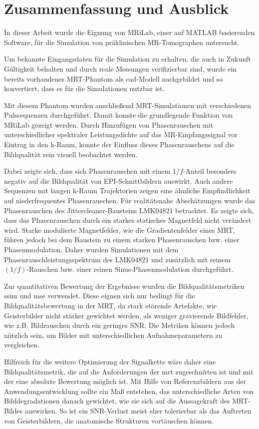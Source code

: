 \chapter{Zusammenfassung und Ausblick}
In dieser Arbeit wurde die Eignung von MRiLab, einer auf MATLAB basierenden Software, für die Simulation von präklinischen MR-Tomographen untersucht.

Um bekannte Eingangsdaten für die Simulation zu erhalten, die auch in Zukunft Gültigkeit behalten und durch reale Messungen verifizierbar sind, wurde ein bereits vorhandenes MRT-Phantom als \gls{cad}-Modell nachgebildet und so konvertiert, dass es für die Simulationen nutzbar ist.

Mit diesem Phantom wurden anschließend MRT-Simulationen mit verschiedenen Pulssequenzen durchgeführt. Damit konnte die grundlegende Funktion von MRiLab gezeigt werden. Durch Hinzufügen von Phasen\-rauschen mit unterschiedlicher spektraler Leistungsdichte auf das MR-\-Empfangs\-signal vor Eintrag in den k-Raum, konnte der Einfluss dieses Phasenrauschens auf die Bildqualität rein visuell beobachtet werden.

Dabei zeigte sich, dass sich Phasenrauschen mit einem $1/f$-Anteil besonders negativ auf die Bildqualität von EPI-Schnittbildern auswirkt. Auch andere Sequenzen mit langen k-Raum Trajektorien zeigen eine ähnliche Empfindlichkeit auf niederfrequentes Phasenrauschen. Für realitätsnahe Abschätzungen wurde das Phasenrauschen des Jittercleaner-Bausteins LMK04821 betrachtet. Es zeigte sich, dass das Phasenrauschen durch ein starkes statisches Magnetfeld nicht verändert wird. Starke modulierte Magnetfelder, wie die Gradientenfelder eines MRT, führen jedoch bei dem Baustein zu einem starken Phasenrauschen bzw. einer Phasenmodulation. Daher wurden Simulationen mit dem Phasenrauschleistungsspektrum des LMK04821 und zusätzlich mit reinem $(1/f)$-Rauschen bzw. einer reinen Sinus-Phasenmodulation durchgeführt.

Zur quantitativen Bewertung der Ergebnisse wurden die Bildqualitätsmetriken \gls{ssim} und \gls{mse} verwendet. Diese eignen sich nur bedingt für die Bildqualitätsbewertung in der MRT, da stark störende Artefakte, wie Geisterbilder nicht stärker gewichtet werden, als weniger gravierende Bildfehler, wie z.B. Bildrauschen durch ein geringes SNR. Die Metriken können jedoch nützlich sein, um Bilder mit unterschiedlichen Aufnahmeparametern zu vergleichen.

Hilfreich für die weitere Optimierung der Signalkette wäre daher eine Bildqualitätsmetrik, die auf die Anforderungen der \gls{mrt} zugeschnitten ist und mit der eine absolute Bewertung möglich ist. Mit Hilfe von Referenzbildern aus der Anwendungsentwicklung sollte ein Maß entstehen, das unterschiedliche Arten von Bilddegradationen danach gewichtet, wie sie sich auf die Aussagekraft des MRT-Bildes auswirken. So ist ein SNR-Verlust meist eher tolerierbar als das Auftreten von Geisterbildern, die anatomische Strukturen vortäuschen können. 